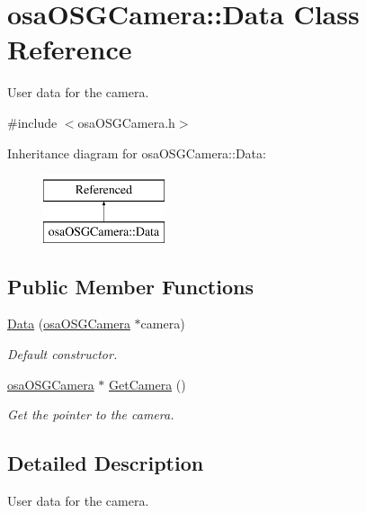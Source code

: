 \hypertarget{classosa_o_s_g_camera_1_1_data}{\section{osa\-O\-S\-G\-Camera\-:\-:Data Class Reference}
\label{classosa_o_s_g_camera_1_1_data}
}


User data for the camera.  




{\ttfamily \#include $<$osa\-O\-S\-G\-Camera.\-h$>$}

Inheritance diagram for osa\-O\-S\-G\-Camera\-:\-:Data\-:\begin{figure}[H]
\begin{center}
\leavevmode
\includegraphics[height=2.000000cm]{d5/dca/classosa_o_s_g_camera_1_1_data}
\end{center}
\end{figure}
\subsection*{Public Member Functions}
\begin{DoxyCompactItemize}
\item 
\hyperlink{classosa_o_s_g_camera_1_1_data_a19e99cce8aef054ad75b99bca25318ca}{Data} (\hyperlink{classosa_o_s_g_camera}{osa\-O\-S\-G\-Camera} $\ast$camera)
\begin{DoxyCompactList}\small\item\em Default constructor. \end{DoxyCompactList}\item 
\hyperlink{classosa_o_s_g_camera}{osa\-O\-S\-G\-Camera} $\ast$ \hyperlink{classosa_o_s_g_camera_1_1_data_a01e705e7aaecee9187a0505087bd7c1a}{Get\-Camera} ()
\begin{DoxyCompactList}\small\item\em Get the pointer to the camera. \end{DoxyCompactList}\end{DoxyCompactItemize}


\subsection{Detailed Description}
User data for the camera. 

